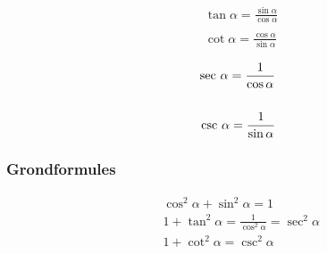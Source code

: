 \begin{minipage}[b]{0.5\linewidth}
\begin{eqnarray*}
&&\tan \alpha = \frac{\sin \alpha}{\cos \alpha}\\
&&\\
&&\cot \alpha = \frac{\cos \alpha}{\sin \alpha}
\end{eqnarray*}
\end{minipage}
\hspace{0.5cm}
\begin{minipage}[b]{0.5\linewidth}
\begin{eqnarray*}
&&\textup{sec }\alpha = \frac{1}{\cos \alpha}\\
&&\\
&&\textup{csc }\alpha = \frac{1}{\sin \alpha}
\end{eqnarray*}
\end{minipage}

\subsubsection{Grondformules}

\begin{minipage}[b]{0.5\linewidth}
\begin{eqnarray*}
&&\cos^2\alpha +\sin^2 \alpha =1\\
&&1+\tan^2\alpha= \frac{1}{\cos^2 \alpha} = \sec^2 \alpha\\
&&1+\cot^2\alpha = \csc^2 \alpha
\end{eqnarray*}
\end{minipage}

